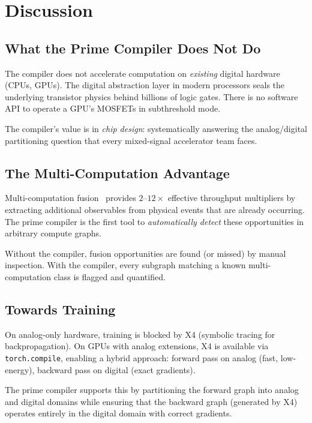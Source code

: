 \documentclass[11pt]{article}
\begin{document}
\section{Discussion}

\subsection{What the Prime Compiler Does Not Do}

The compiler does not accelerate computation on \textit{existing} digital hardware (CPUs, GPUs). The digital abstraction layer in modern processors seals the underlying transistor physics behind billions of logic gates. There is no software API to operate a GPU's MOSFETs in subthreshold mode.

The compiler's value is in \textit{chip design}: systematically answering the analog/digital partitioning question that every mixed-signal accelerator team faces.

\subsection{The Multi-Computation Advantage}

Multi-computation fusion~\cite{bieg2026} provides $2$--$12\times$ effective throughput multipliers by extracting additional observables from physical events that are already occurring. The prime compiler is the first tool to \textit{automatically detect} these opportunities in arbitrary compute graphs.

Without the compiler, fusion opportunities are found (or missed) by manual inspection. With the compiler, every subgraph matching a known multi-computation class is flagged and quantified.

\subsection{Towards Training}

On analog-only hardware, training is blocked by X4 (symbolic tracing for backpropagation). On GPUs with analog extensions, X4 is available via \texttt{torch.compile}, enabling a hybrid approach: forward pass on analog (fast, low-energy), backward pass on digital (exact gradients).

The prime compiler supports this by partitioning the forward graph into analog and digital domains while ensuring that the backward graph (generated by X4) operates entirely in the digital domain with correct gradients.
\end{document}
